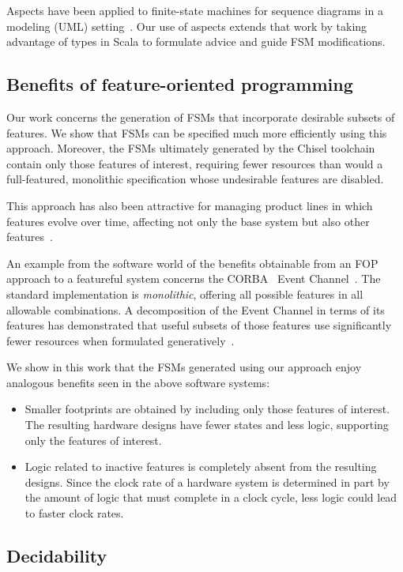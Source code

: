 \documentclass[sigplan,anonymous,review]{acmart}
\begin{document}
Aspects have been applied to finite-state machines for sequence diagrams in a modeling (UML) setting~\cite{aspectsUML}.  Our use of aspects extends that work by taking advantage of types in Scala to formulate advice and guide FSM modifications. 

\subsection{Benefits of feature-oriented programming}\label{sec:benefop}

Our work concerns the generation of FSMs that incorporate desirable subsets of features.  We show that FSMs can be specified much more efficiently using this approach.  Moreover, the FSMs ultimately generated by the Chisel toolchain contain only those features of interest, requiring fewer resources than would a full-featured, monolithic specification whose undesirable features are disabled.

This approach has also been attractive for managing product lines in which features evolve over time, affecting not only the base system but also other features~\cite{10.1145/2897695.2897701}. 

An example from the software world of the benefits obtainable from an FOP approach to a featureful system concerns the CORBA~\cite{CORBA:00} Event Channel~\cite{CORBAService:02a}. The standard implementation is \emph{monolithic}, offering all possible features in all allowable combinations.  A decomposition of the Event Channel in terms of its features has demonstrated that useful subsets of those features use significantly fewer resources when formulated generatively~\cite{Pratap:04}.   

We show in this work that the FSMs generated using our approach enjoy analogous benefits seen in the above software systems:
\begin{itemize}
    \item Smaller footprints are obtained by including only those features of interest.  The resulting hardware designs have fewer states and less logic, supporting only the features of interest.
    \item Logic related to inactive features is completely absent from the resulting designs. Since the clock rate of a hardware system is determined in part by the amount of logic that must complete in a clock cycle, less logic could lead to faster clock rates.
\end{itemize}

  
\subsection{Decidability}\label{sec:decide}
\end{document}
